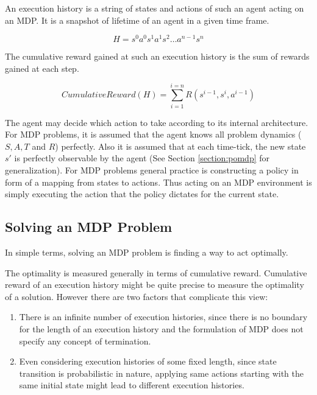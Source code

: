 An execution history is a string of states and actions of such an agent acting on an MDP. It is a snapshot of lifetime of an agent in a given time frame.

\begin{displaymath}
H = s^0a^0s^1a^1s^2 \ldots a^{n-1}s^{n}
\end{displaymath}

The cumulative reward gained at such an execution history is the sum of rewards gained at each step.

\begin{displaymath}
Cumulative Reward(H) = \sum_{i=1}^{i=n} R(s^{i-1}, s^i, a^{i-1})
\end{displaymath}

The agent may decide which action to take according to its internal architecture. For MDP problems, it is assumed that the agent knows all problem dynamics ($S, A, T$ and $R$) perfectly. Also it is assumed that at each time-tick, the new state $s'$ is perfectly observable by the agent (See Section \ref{section:pomdp} for generalization). For MDP problems general practice is constructing a policy in form of a mapping from states to actions. Thus acting on an MDP environment is simply executing the action that the policy dictates for the current state.

\subsection{Solving an MDP Problem}

In simple terms, solving an MDP problem is finding a way to act optimally.

The optimality is measured generally in terms of cumulative reward. Cumulative reward of an execution history might be quite precise to measure the optimality of a solution. However there are two factors that complicate this view:

\begin{enumerate}
\item There is an infinite number of execution histories, since there is no boundary for the length of an execution history and the formulation of MDP does not specify any concept of termination.
\item Even considering execution histories of some fixed length, since state transition is probabilistic in nature, applying same actions starting with the same initial state might lead to different execution histories.
\end{enumerate}

